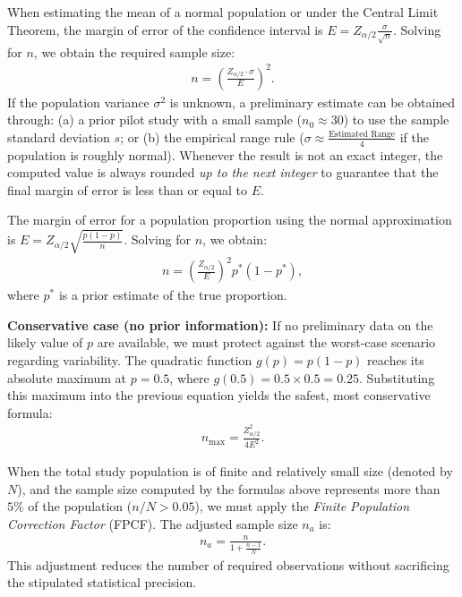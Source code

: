 \begin{teorema}
	When estimating the mean of a normal population or under the Central Limit Theorem, the margin of error of the confidence interval is $E = Z_{\alpha/2} \frac{\sigma}{\sqrt{n}}$. Solving for $n$, we obtain the required sample size:
	\begin{align}
		n = \left( \frac{Z_{\alpha/2} \cdot \sigma}{E} \right)^2.
		\label{eq:n_media}
	\end{align}
	If the population variance $\sigma^2$ is unknown, a preliminary estimate can be obtained through: (a) a prior pilot study with a small sample ($n_0 \approx 30$) to use the sample standard deviation $s$; or (b) the empirical range rule ($\sigma \approx \frac{\text{Estimated Range}}{4}$ if the population is roughly normal). Whenever the result is not an exact integer, the computed value is always rounded \emph{up to the next integer} to guarantee that the final margin of error is less than or equal to $E$.
\end{teorema}

\begin{teorema}
	The margin of error for a population proportion using the normal approximation is $E = Z_{\alpha/2} \sqrt{\frac{p(1-p)}{n}}$. Solving for $n$, we obtain:
	\begin{align}
		n = \left( \frac{Z_{\alpha/2}}{E} \right)^2 p^* (1 - p^*),
		\label{eq:n_proporcion}
	\end{align}
	where $p^*$ is a prior estimate of the true proportion.
	
	\textbf{Conservative case (no prior information):} If no preliminary data on the likely value of $p$ are available, we must protect against the worst-case scenario regarding variability. The quadratic function $g(p) = p(1-p)$ reaches its absolute maximum at $p = 0.5$, where $g(0.5) = 0.5 \times 0.5 = 0.25$. Substituting this maximum into the previous equation yields the safest, most conservative formula:
	\begin{align}
		n_{\text{max}} = \frac{Z_{\alpha/2}^2}{4 E^2}.
		\label{eq:n_conservador}
	\end{align}
\end{teorema}

\begin{observacion}
	When the total study population is of finite and relatively small size (denoted by $N$), and the sample size computed by the formulas above represents more than $5\%$ of the population ($n / N > 0.05$), we must apply the \emph{Finite Population Correction Factor} (FPCF). The adjusted sample size $n_a$ is:
	\begin{align}
		n_a = \frac{n}{1 + \frac{n-1}{N}}.
	\end{align}
	This adjustment reduces the number of required observations without sacrificing the stipulated statistical precision.
\end{observacion}
